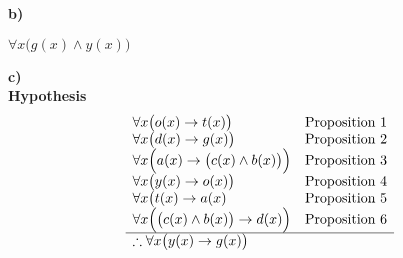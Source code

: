 \documentclass[letterpaper]{article}
\renewcommand\subsection{}
\begin{document}
		\subsection{\bf b)\sf}
        	\begin{center}
        		$\forall x \big (g(x) \wedge y(x)\big )$
        	\end{center}
        \subsection{\bf c)\sf} \\
        \subsection{\bf Hypothesis \sf}
        	\begin{displaymath}
        		\begin{array}{ll}
        			\forall x \big(o(x) \rightarrow t(x) \big ) & $Proposition 1$\\
                    \forall x \big(d(x) \rightarrow g(x) \big ) & $Proposition 2$\\
                    \forall x \Big(a(x) \rightarrow \big (c(x) \wedge b(x) \big ) \Big ) & $Proposition 3$ \\
                    \forall x \big (y(x) \rightarrow o(x) \big ) & $Proposition 4$ \\
                    \forall x \big (t(x) \rightarrow a(x) & $Proposition 5$ \\
                    \forall x \Big ( \big (c(x) \wedge b(x) \big ) \rightarrow d(x) \Big ) & $Proposition 6$ \\
                    \hline
                    \therefore \forall x \big (y(x) \rightarrow g(x) \big ) & \\
        		\end{array}
        	\end{displaymath}
\end{document}
